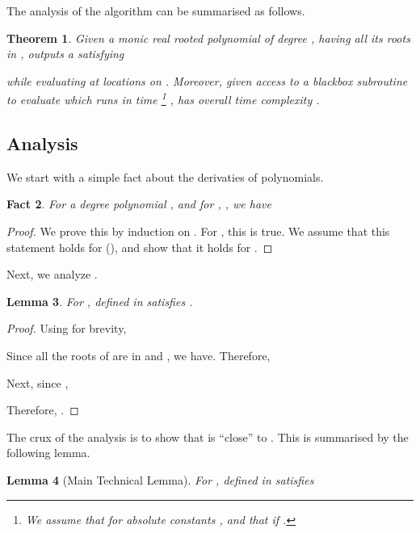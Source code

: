 \documentclass{article}[12pt]
\newtheorem{theorem}{Theorem}[section]
\newtheorem{lemma}[theorem]{Lemma}
\newtheorem{fact}[theorem]{Fact}
\theoremstyle{definition}
\begin{document}
The analysis of the algorithm can be summarised as follows. 
\begin{theorem}
\label{thm:analysis}
Given a monic real rooted polynomial  of degree , having all its roots in
, 
outputs a  satisfying

while evaluating  at  locations on .
Moreover, given access to a blackbox subroutine to evaluate  which runs in 
time \footnote{We assume that  for absolute constants , and that
  if .}
 ,
 has overall time complexity
.
\end{theorem}



\subsection{Analysis}

We start with a simple fact about the derivaties of polynomials.
\begin{fact}
\label{fact:charpderivative}
For a degree  polynomial , and for , 
, we have

\end{fact}

\begin{proof}
We prove this by induction on . 
For , this is true.  
We assume that this statement holds for  (), and show that it holds for .

\end{proof}

Next, we analyze .
\begin{lemma}
\label{lem:tg1}
For , 
 defined in  satisfies 
.
\end{lemma}

\begin{proof}


Using  for brevity,

Since all the roots of  are in  and , 
we have. Therefore,  

Next, since ,  

Therefore,  .

\end{proof}



The crux of the analysis is to show that  is ``close'' to .
This is summarised by the following lemma. 
\begin{lemma}[Main Technical Lemma]
\label{lem:approx-der}
For , 
 defined in  satisfies
 
\end{lemma}
\end{document}
